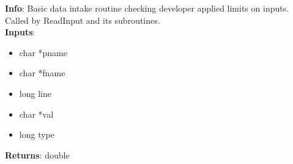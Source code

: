 \textbf{Info}: Basic data intake routine checking developer applied limits on
inputs. Called by ReadInput and its subroutines.\\

\noindent \textbf{Inputs}:
\begin{itemize}
\item{char *pname}
\item{char *fname}
\item{long line}
\item{char *val}
\item{long type}
\end{itemize}

\noindent \textbf{Returns}: double
